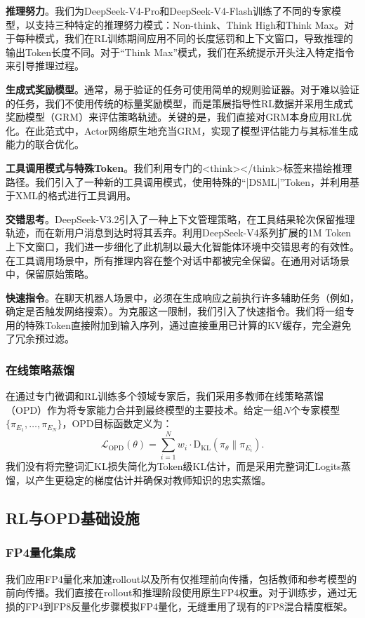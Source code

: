 \documentclass[11pt,a4paper]{article}
\newcommand{\dsvfour}{DeepSeek-V4}
\newcommand{\dsvfourpro}{DeepSeek-V4-Pro}
\newcommand{\dsvfourflash}{DeepSeek-V4-Flash}
\newcommand{\dsvthreetwo}{DeepSeek-V3.2}
\begin{document}
\textbf{推理努力}。我们为\dsvfourpro 和\dsvfourflash 训练了不同的专家模型，以支持三种特定的推理努力模式：Non-think、Think High和Think Max。对于每种模式，我们在RL训练期间应用不同的长度惩罚和上下文窗口，导致推理的输出Token长度不同。对于“Think Max”模式，我们在系统提示开头注入特定指令来引导推理过程。

\textbf{生成式奖励模型}。通常，易于验证的任务可使用简单的规则验证器。对于难以验证的任务，我们不使用传统的标量奖励模型，而是策展指导性RL数据并采用生成式奖励模型（GRM）来评估策略轨迹。关键的是，我们直接对GRM本身应用RL优化。在此范式中，Actor网络原生地充当GRM，实现了模型评估能力与其标准生成能力的联合优化。

\textbf{工具调用模式与特殊Token}。我们利用专门的<think></think>标签来描绘推理路径。我们引入了一种新的工具调用模式，使用特殊的“|DSML|”Token，并利用基于XML的格式进行工具调用。

\textbf{交错思考}。\dsvthreetwo 引入了一种上下文管理策略，在工具结果轮次保留推理轨迹，而在新用户消息到达时将其丢弃。利用\dsvfour 系列扩展的1M Token上下文窗口，我们进一步细化了此机制以最大化智能体环境中交错思考的有效性。在工具调用场景中，所有推理内容在整个对话中都被完全保留。在通用对话场景中，保留原始策略。

\textbf{快速指令}。在聊天机器人场景中，必须在生成响应之前执行许多辅助任务（例如，确定是否触发网络搜索）。为克服这一限制，我们引入了快速指令。我们将一组专用的特殊Token直接附加到输入序列，通过直接重用已计算的KV缓存，完全避免了冗余预过滤。

\subsubsection{在线策略蒸馏}
在通过专门微调和RL训练多个领域专家后，我们采用多教师在线策略蒸馏（OPD）作为将专家能力合并到最终模型的主要技术。给定一组\(N\)个专家模型\(\{\pi_{E_1},\dots,\pi_{E_N}\}\)，OPD目标函数定义为：
\[\mathcal{L}_{\mathrm{OPD}}(\theta) = \sum_{i=1}^{N}w_{i}\cdot \mathrm{D}_{\mathrm{KL}}\left(\pi_{\theta}\parallel \pi_{E_{i}}\right).\]
我们没有将完整词汇KL损失简化为Token级KL估计，而是采用完整词汇Logits蒸馏，以产生更稳定的梯度估计并确保对教师知识的忠实蒸馏。

\subsection{RL与OPD基础设施}
\subsubsection{FP4量化集成}
我们应用FP4量化来加速rollout以及所有仅推理前向传播，包括教师和参考模型的前向传播。我们直接在rollout和推理阶段使用原生FP4权重。对于训练步，通过无损的FP4到FP8反量化步骤模拟FP4量化，无缝重用了现有的FP8混合精度框架。
\end{document}
